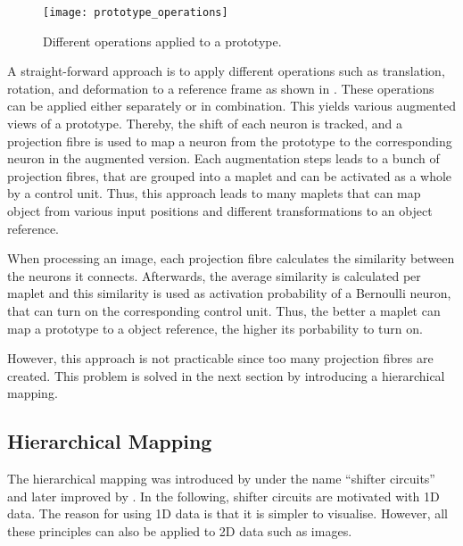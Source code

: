 \begin{figure}[h]
    \centering
    \texttt{[image: prototype\_operations]}
    \caption[Operations applied to a prototype]{Different operations applied to a prototype.}
\end{figure}
A straight-forward approach is to apply different operations such as translation, rotation, and deformation to a reference frame as shown in . These operations can be applied either separately or in combination.
This yields various augmented views of a prototype.
Thereby, the shift of each neuron is tracked, and a projection fibre is used to map a neuron from the prototype to the corresponding neuron in the augmented version.
Each augmentation steps leads to a bunch of projection fibres, that are grouped into a maplet and can be activated as a whole by a control unit.
Thus, this approach leads to many maplets that can map object from various input positions and different transformations to an object reference.

When processing an image, each projection fibre calculates the similarity between the neurons it connects.
Afterwards, the average similarity is calculated per maplet and this similarity is used as activation probability of a Bernoulli neuron, that can turn on the corresponding control unit.
Thus, the better a maplet can map a prototype to a object reference, the higher its porbability to turn on.

However, this approach is not practicable since too many projection fibres are created.
This problem is solved in the next section by introducing a hierarchical mapping.

\subsection{Hierarchical Mapping}
The hierarchical mapping was introduced by  under the name ``shifter circuits'' and later improved by .
In the following, shifter circuits are motivated with 1D data.
The reason for using 1D data is that it is simpler to visualise.
However, all these principles can also be applied to 2D data such as images.













